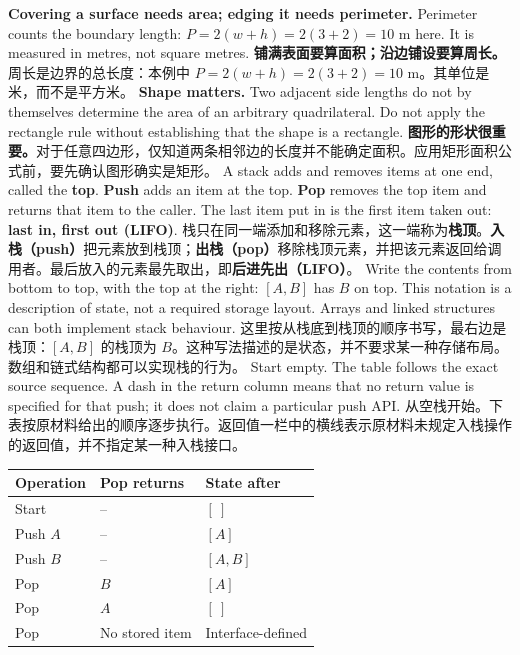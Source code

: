  {\textbf{Covering a surface needs area; edging it needs perimeter.} Perimeter counts the boundary length: $P=2(w+h)=2(3+2)=10$ m here. It is measured in metres, not square metres.}
 {\textbf{铺满表面要算面积；沿边铺设要算周长。}周长是边界的总长度：本例中 $P=2(w+h)=2(3+2)=10$ m。其单位是米，而不是平方米。}
 {\textbf{Shape matters.} Two adjacent side lengths do not by themselves determine the area of an arbitrary quadrilateral. Do not apply the rectangle rule without establishing that the shape is a rectangle.}
 {\textbf{图形的形状很重要。}对于任意四边形，仅知道两条相邻边的长度并不能确定面积。应用矩形面积公式前，要先确认图形确实是矩形。}
\clearpage
{}
 {A stack adds and removes items at one end, called the \textbf{top}. \textbf{Push} adds an item at the top. \textbf{Pop} removes the top item and returns that item to the caller. The last item put in is the first item taken out: \textbf{last in, first out (LIFO)}.}
 {栈只在同一端添加和移除元素，这一端称为\textbf{栈顶}。\textbf{入栈（push）}把元素放到栈顶；\textbf{出栈（pop）}移除栈顶元素，并把该元素返回给调用者。最后放入的元素最先取出，即\textbf{后进先出（LIFO）}。}
 {Write the contents from bottom to top, with the top at the right: $[A,B]$ has $B$ on top. This notation is a description of state, not a required storage layout. Arrays and linked structures can both implement stack behaviour.}
 {这里按从栈底到栈顶的顺序书写，最右边是栈顶：$[A,B]$ 的栈顶为 $B$。这种写法描述的是状态，并不要求某一种存储布局。数组和链式结构都可以实现栈的行为。}
 {Start empty. The table follows the exact source sequence. A dash in the return column means that no return value is specified for that push; it does not claim a particular push API.}
 {从空栈开始。下表按原材料给出的顺序逐步执行。返回值一栏中的横线表示原材料未规定入栈操作的返回值，并不指定某一种入栈接口。}
 {\begin{tabularx}{\linewidth}{@{}l l X@{}}\toprule Operation & Pop returns & State after\\\midrule
 Start & -- & $[\ ]$\\
 Push $A$ & -- & $[A]$\\
 Push $B$ & -- & $[A,B]$\\
 Pop & $B$ & $[A]$\\
 Pop & $A$ & $[\ ]$\\
 Pop & No stored item & Interface-defined\\\bottomrule\end{tabularx}}

